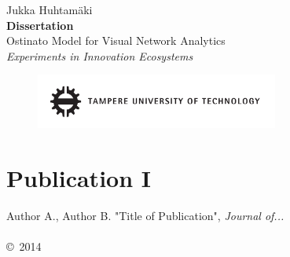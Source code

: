 \documentclass[twoside,b5paper,openright]{memoir}
\newcommand{\todo}[1] {
\textbf{TODO}\textit{ #1}}
\newcommand*{\titleTH}{\begingroup %
\raggedleft %
\vspace*{\baselineskip} %

{\Large Jukka Huhtamäki}\\[0.167\textheight] %

{\LARGE\bfseries Dissertation}\\[\baselineskip] %

{{\huge Ostinato Model for Visual Network Analytics}}\\[\baselineskip] 
{\Large \textit{Experiments in Innovation Ecosystems}}\par 

\vfill 

\begin{figure}[htb]
\includegraphics[width=8cm]{figure/tut-logo.pdf}
\label{fig:tut-logo}
\end{figure}

\vspace*{3\baselineskip} %
\endgroup}
\begin{document}
\frontmatter
{}
\titleTH
\clearpage
{}


% 

\cleardoublepage
\tableofcontents* %

% 


\mainmatter



% 
% 







\backmatter

%

% 
% 





% 
% 


\renewcommand\appendixpagename{Publications}
\renewcommand\appendixtocname{Publications}

\appendix
\begingroup
\makeatletter
\let\ps@plain\ps@empty
\appendixpage
\makeatother
\endgroup

\chapter*{Publication I}
\thispagestyle{empty}
Author A., Author B. "Title of Publication", \emph{Journal of...}
\\\\
\noindent\copyright\ 2014 

% 
\end{document}
